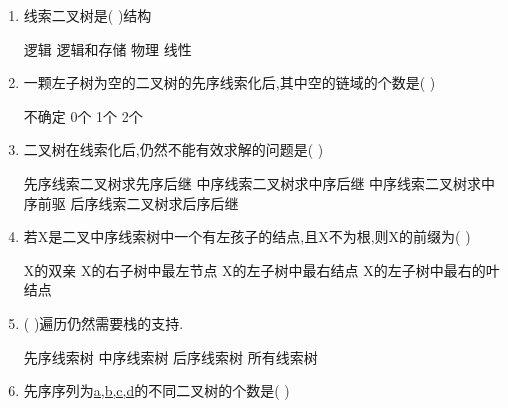\documentclass[12pt, a4paper, oneside, UTF8]{ctexbook}
\begin{document}
\begin{enumerate}
    \item 线索二叉树是(    )结构 
    \begin{choices}
        \task 逻辑
        \task 逻辑和存储
        \task 物理
        \task 线性
    \end{choices}

    \item 一颗左子树为空的二叉树的先序线索化后,其中空的链域的个数是(    ) 
    \begin{choices}
        \task 不确定
        \task 0个
        \task 1个
        \task 2个
    \end{choices} 

    \item 二叉树在线索化后,仍然不能有效求解的问题是(    ) 
    \begin{choices}[2]
        \task 先序线索二叉树求先序后继
        \task 中序线索二叉树求中序后继
        \task 中序线索二叉树求中序前驱
        \task 后序线索二叉树求后序后继 
    \end{choices}

    \item 若X是二叉中序线索树中一个有左孩子的结点,且X不为根,则X的前缀为(    ) 
    \begin{choices}[2]
        \task X的双亲
        \task X的右子树中最左节点
        \task X的左子树中最右结点
        \task X的左子树中最右的叶结点
    \end{choices}


    \item (   )遍历仍然需要栈的支持. 
    \begin{choices}
        \task 先序线索树
        \task 中序线索树
        \task 后序线索树 
        \task 所有线索树 
    \end{choices}

    \item \bl 先序序列为\underline{a,b,c,d}的不同二叉树的个数是(      ) 


\end{enumerate}
\end{document}
